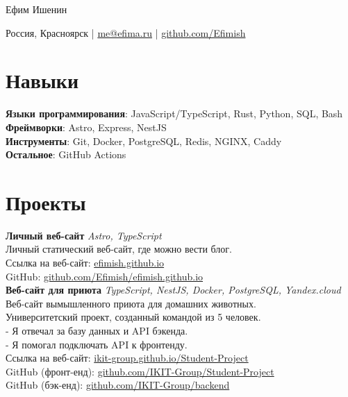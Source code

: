 \documentclass[a4paper, 12pt]{article}
\begin{document}
\centerline{\Huge Ефим Ишенин}
\vspace{10pt}
\centerline{
  Россия, Красноярск |
  \href{mailto:me@efima.ru}{me@efima.ru} |
  \href{https://github.com/Efimish}{github.com/Efimish}
}

\section{Навыки}

\textbf{Языки программирования}: JavaScript/TypeScript, Rust, Python, SQL, Bash \\
\textbf{Фреймворки}: Astro, Express, NestJS \\
\textbf{Инструменты}: Git, Docker, PostgreSQL, Redis, NGINX, Caddy \\
\textbf{Остальное}: GitHub Actions

\section{Проекты}

\textbf{Личный веб-сайт} \hfill \textit{Astro, TypeScript} \\
Личный статический веб-сайт, где можно вести блог. \\
Ссылка на веб-сайт: \href{https://efimish.github.io/}{efimish.github.io} \\
GitHub: \href{https://github.com/Efimish/efimish.github.io}{github.com/Efimish/efimish.github.io} \\

\textbf{Веб-сайт для приюта} \hfill \textit{TypeScript, NestJS, Docker, PostgreSQL, Yandex.cloud} \\
Веб-сайт вымышленного приюта для домашних животных. \\
Университетский проект, созданный командой из 5 человек. \\
- Я отвечал за базу данных и API бэкенда. \\
- Я помогал подключать API к фронтенду. \\
Ссылка на веб-сайт: \href{https://ikit-group.github.io/Student-Project/}{ikit-group.github.io/Student-Project} \\
GitHub (фронт-енд): \href{https://github.com/IKIT-Group/Student-Project}{github.com/IKIT-Group/Student-Project} \\
GitHub (бэк-енд): \href{https://github.com/IKIT-Group/backend}{github.com/IKIT-Group/backend} \\
\end{document}
